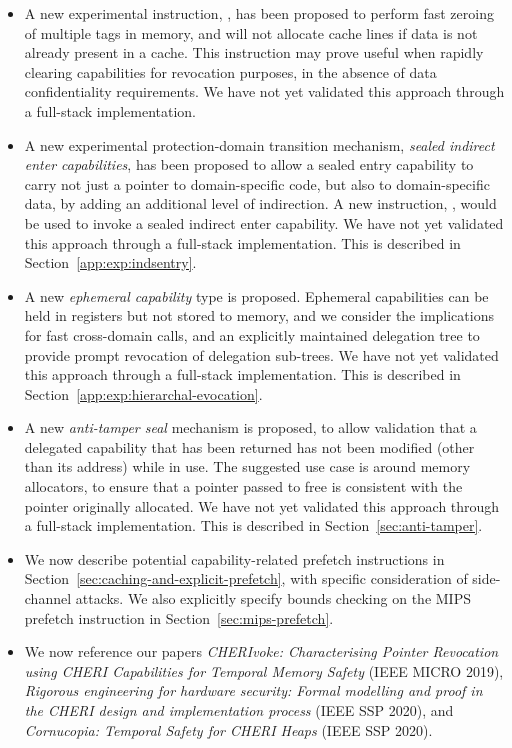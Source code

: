 \begin{itemize}
\item A new experimental instruction, , has been proposed
  to perform fast zeroing of multiple tags in memory, and will not allocate
  cache lines if data is not already present in a cache.
  This instruction may prove useful when rapidly clearing capabilities for
  revocation purposes, in the absence of data confidentiality requirements.
  We have not yet validated this approach through a full-stack implementation.

\item A new experimental protection-domain transition mechanism,
  \textit{sealed indirect enter capabilities}, has been proposed to allow
  a sealed entry capability to carry not just a pointer to domain-specific
  code, but also to domain-specific data, by adding an additional level of
  indirection.
  A new instruction, , would be used to invoke a
  sealed indirect enter capability.
  We have not yet validated this approach through a full-stack implementation.
  This is described in Section~\ref{app:exp:indsentry}.

\item A new \emph{ephemeral capability} type is proposed.
  Ephemeral capabilities can be held in registers but not stored to memory,
  and we consider the implications for fast cross-domain calls, and an
  explicitly maintained delegation tree to provide prompt revocation of
  delegation sub-trees.
  We have not yet validated this approach through a full-stack implementation.
  This is described in Section~\ref{app:exp:hierarchal-evocation}.

\item A new \emph{anti-tamper seal} mechanism is proposed, to allow
  validation that a delegated capability that has been returned has not been
  modified (other than its address) while in use.
  The suggested use case is around memory allocators, to ensure that a pointer
  passed to free is consistent with the pointer originally allocated.
  We have not yet validated this approach through a full-stack implementation.
  This is described in Section~\ref{sec:anti-tamper}.

\item We now describe potential capability-related prefetch instructions in
  Section~\ref{sec:caching-and-explicit-prefetch}, with specific
  consideration of side-channel attacks.
  We also explicitly specify \DDC{} bounds checking on the MIPS
   prefetch instruction in
  Section~\ref{sec:mips-prefetch}.

\item We now reference our papers \textit{CHERIvoke: Characterising Pointer
  Revocation using CHERI Capabilities for Temporal Memory Safety} (IEEE MICRO
  2019), \textit{Rigorous engineering for hardware security: Formal modelling
  and proof in the CHERI design and implementation process} (IEEE SSP 2020),
  and \textit{Cornucopia: Temporal Safety for CHERI Heaps} (IEEE SSP 2020).

\end{itemize}
